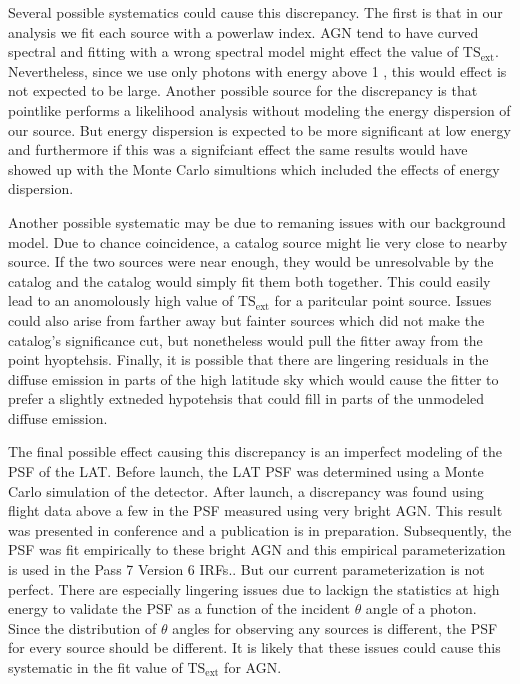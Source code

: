 \documentclass[preprint]{aastex}
\newcommand{\gev}{\text{GeV}\xspace}
\newcommand{\tsext}{{\ensuremath{\text{TS}_\text{ext}}}\xspace}
\begin{document}
Several possible systematics could cause this discrepancy. The first
is that in our analysis we fit each source with a powerlaw index.
AGN tend to have curved spectral and fitting with a wrong spectral
model might effect the value of \tsext. Nevertheless, since we use only
photons with energy above 1 \gev, this would effect is not expected to be large.
Another possible source for the discrepancy is that pointlike performs a
likelihood analysis without modeling the energy dispersion of our source.
But energy dispersion is expected to be more significant at low
energy and furthermore if this was a signifciant effect the same results
would have showed up with the Monte Carlo simultions which included the
effects of energy dispersion. 

Another possible systematic may be due to remaning issues with our
background model. Due to chance coincidence, a catalog source might
lie very close to nearby source. If the two sources were near enough,
they would be unresolvable by the catalog and the catalog would simply
fit them both together.  This could easily lead to an anomolously high
value of \tsext for a paritcular point source. Issues could also arise
from farther away but fainter sources which did not make the catalog's
significance cut, but nonetheless would pull the fitter away from the
point hyoptehsis.  Finally, it is possible that there are lingering
residuals in the diffuse emission in parts of the high latitude sky
which would cause the fitter to prefer a slightly extneded hypotehsis
that could fill in parts of the unmodeled diffuse emission.

The final possible effect causing this discrepancy is an imperfect
modeling of the PSF of the LAT.  Before launch, the LAT PSF
was determined using a Monte Carlo simulation of the detector.
After launch, a discrepancy was found using flight data above a
few \gev in the PSF measured using very bright AGN.  This result
was presented in conference and a publication is in preparation.
Subsequently, the PSF was fit empirically to these bright AGN and this
empirical parameterization is used in the Pass 7 Version 6 IRFs.\cite{
https://confluence.slac.stanford.edu/download/attachments/102860834/FermiSymp2011_CAPSF_v5_ROTH.pptx
}. But our current parameterization is not perfect. There are especially
lingering issues due to lackign the statistics at high energy to
validate the PSF as a function of the incident $\theta$ angle of a
photon. Since the distribution of $\theta$ angles for observing any
sources is different, the PSF for every source should be different.
It is likely that these issues could cause this systematic in the fit
value of \tsext for AGN.
\end{document}

